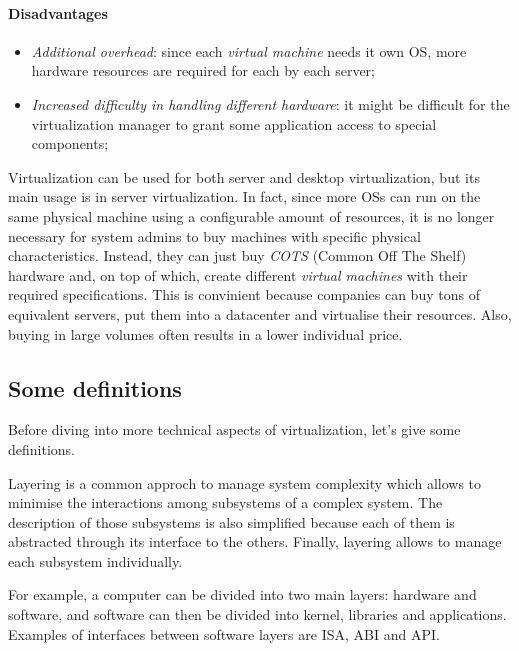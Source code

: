 \paragraph{Disadvantages}
\begin{itemize}
    \item\emph{Additional overhead}: since each \emph{virtual machine} needs it
    own OS, more hardware resources are required for each by each server;
    \item\emph{Increased difficulty in handling different hardware}: it might
    be difficult for the virtualization manager to grant some application access
    to special components;
\end{itemize}
Virtualization can be used for both server and desktop virtualization, but its
main usage is in server virtualization. In fact, since more OSs can
run on the same physical machine using a configurable amount of resources, it is
no longer necessary for system admins to buy machines with specific physical
characteristics. Instead, they can just buy \emph{COTS} (Common Off The Shelf)
hardware and, on top of which, create different \emph{virtual machines} with their
required specifications. This is convinient because companies can buy tons of
equivalent servers, put them into a datacenter and virtualise their resources.
Also, buying in large volumes often results in a lower individual price.

\subsection{Some definitions}
Before diving into more technical aspects of virtualization, let's give some
definitions.

\begin{definition}[Layering]
    Layering is a common approch to manage system complexity which allows
    to minimise the interactions among subsystems of a complex system. The
    description of those subsystems is also simplified because each of them is
    abstracted through its interface to the others. Finally, layering allows
    to manage each subsystem individually.
\end{definition}\noindent
For example, a computer can be divided into two main layers: hardware and software,
and software can then be divided into kernel, libraries and applications.
Examples of interfaces between software layers are ISA, ABI and API.

